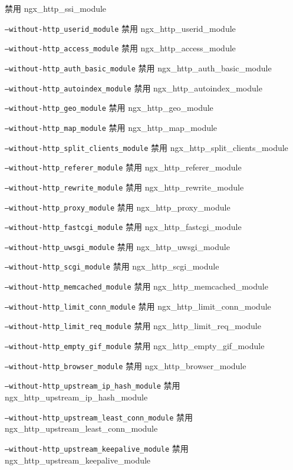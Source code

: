 \begin{compactitem}
禁用 ngx\_http\_ssi\_module
\item \texttt{--without-http\_userid\_module}
禁用 ngx\_http\_userid\_module
\item \texttt{--without-http\_access\_module}
禁用 ngx\_http\_access\_module
\item \texttt{--without-http\_auth\_basic\_module}
禁用 ngx\_http\_auth\_basic\_module
\item \texttt{--without-http\_autoindex\_module}
禁用 ngx\_http\_autoindex\_module
\item \texttt{--without-http\_geo\_module}
禁用 ngx\_http\_geo\_module
\item \texttt{--without-http\_map\_module}
禁用 ngx\_http\_map\_module
\item \texttt{--without-http\_split\_clients\_module}
禁用 ngx\_http\_split\_clients\_module
\item \texttt{--without-http\_referer\_module}
禁用 ngx\_http\_referer\_module
\item \texttt{--without-http\_rewrite\_module}
禁用 ngx\_http\_rewrite\_module
\item \texttt{--without-http\_proxy\_module}
禁用 ngx\_http\_proxy\_module
\item \texttt{--without-http\_fastcgi\_module}
禁用 ngx\_http\_fastcgi\_module
\item \texttt{--without-http\_uwsgi\_module}
禁用 ngx\_http\_uwsgi\_module
\item \texttt{--without-http\_scgi\_module}
禁用 ngx\_http\_scgi\_module
\item \texttt{--without-http\_memcached\_module}
禁用 ngx\_http\_memcached\_module
\item \texttt{--without-http\_limit\_conn\_module}
禁用 ngx\_http\_limit\_conn\_module
\item \texttt{--without-http\_limit\_req\_module}
禁用 ngx\_http\_limit\_req\_module
\item \texttt{--without-http\_empty\_gif\_module}
禁用 ngx\_http\_empty\_gif\_module
\item \texttt{--without-http\_browser\_module}
禁用 ngx\_http\_browser\_module
\item \texttt{--without-http\_upstream\_ip\_hash\_module}
禁用 ngx\_http\_upstream\_ip\_hash\_module
\item \texttt{--without-http\_upstream\_least\_conn\_module}
禁用 ngx\_http\_upstream\_least\_conn\_module
\item \texttt{--without-http\_upstream\_keepalive\_module}
禁用 ngx\_http\_upstream\_keepalive\_module

\end{compactitem}
